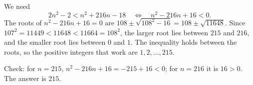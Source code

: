 We need
\[2n^2-2<n^2+216n-18\quad\Longleftrightarrow\quad n^2-216n+16<0 .\]
The roots of $n^2-216n+16=0$ are $108\pm\sqrt{108^2-16}=108\pm\sqrt{11648}$. Since $107^2=11449<11648<11664=108^2$, the larger root lies between $215$ and $216$, and the smaller root lies between $0$ and $1$. The inequality holds between the roots, so the positive integers that work are $1,2,\ldots,215$.

Check: for $n=215$, $n^2-216n+16=-215+16<0$; for $n=216$ it is $16>0$. The answer is $\boxed{215}$.
